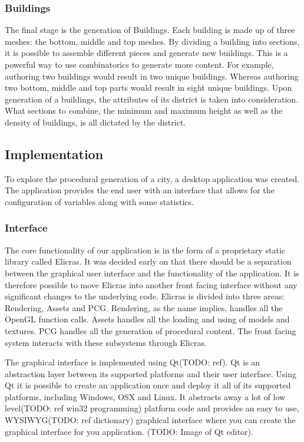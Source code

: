 		\subsubsection{Buildings}
		The final stage is the generation of Buildings. Each building is made up of three meshes: the bottom, middle and top meshes. By dividing a building into sections, it is possible to assemble different pieces and generate new buildings. This is a powerful way to use combinatorics to generate more content. For example, authoring two buildings would result in two unique buildings. Whereas authoring two bottom, middle and top parts would result in eight unique buildings. Upon generation of a buildings, the attributes of its district is taken into consideration. What sections to combine, the minimum and maximum height as well as the density of buildings, is all dictated by the district.

	\subsection{Implementation}
	To explore the procedural generation of a city, a desktop application was created. The application provides the end user with an interface that allows for the configuration of variables along with some statistics. 
	
		\subsubsection{Interface}
		The core functionality of our application is in the form of a proprietary static library called Elicras. It was decided early on that there should be a separation between the graphical user interface and the functionality of the application. It is therefore possible to move Elicras into another front facing interface without any significant changes to the underlying code. Elicras is divided into three areas: Rendering, Assets and PCG. Rendering, as the name implies, handles all the OpenGL function calls. Assets handles all the loading and using of models and textures. PCG handles all the generation of procedural content. The front facing system interacts with these subsystems through Elicras.
		
		\par
		The graphical interface is implemented using Qt(TODO: ref). Qt is an abstraction layer between its supported platforms and their user interface. Using Qt it is possible to create an application once and deploy it all of its supported platforms, including Windows, OSX and Linux. It abstracts away a lot of low level(TODO: ref win32 programming) platform code and provides an easy to use, WYSIWYG(TODO: ref dictionary) graphical interface where you can create the graphical interface for you application. (TODO: Image of Qt editor).
		
